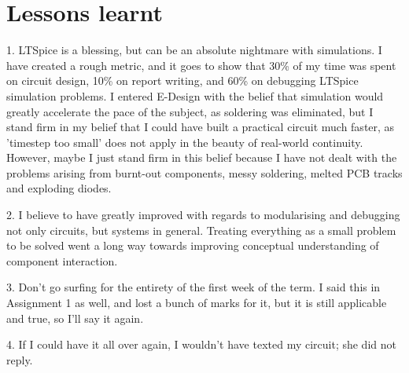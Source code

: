 \section{Lessons learnt}
1. LTSpice is a blessing, but can be an absolute nightmare with simulations. I have created a rough metric, and it goes to show that 30\% of my time was spent on circuit design, 10\% on report writing, and 60\% on debugging LTSpice simulation problems. I entered E-Design with the belief that simulation would greatly accelerate the pace of the subject, as soldering was eliminated, but I stand firm in my belief that I could have built a practical circuit much faster, as 'timestep too small' does not apply in the beauty of real-world continuity. However, maybe I just stand firm in this belief because I have not dealt with the problems arising from burnt-out components, messy soldering, melted PCB tracks and exploding diodes.

2. I believe to have greatly improved with regards to modularising and debugging not only circuits, but systems in general. Treating everything as a small problem to be solved went a long way towards improving conceptual understanding of component interaction.

3. Don't go surfing for the entirety of the first week of the term. I said this in Assignment 1 as well, and lost a bunch of marks for it, but it is still applicable and true, so I'll say it again.

4. If I could have it all over again, I wouldn't have texted my circuit; she did not reply.